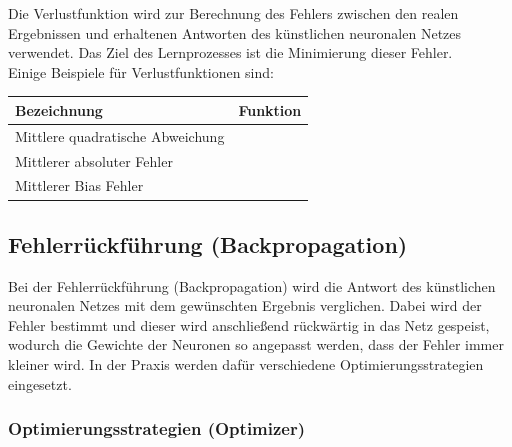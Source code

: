 	Die Verlustfunktion wird zur Berechnung des Fehlers zwischen den realen Ergebnissen und erhaltenen Antworten des künstlichen neuronalen Netzes verwendet. Das Ziel des Lernprozesses ist die Minimierung dieser Fehler.  \cite{ai-united} \\

	Einige Beispiele für Verlustfunktionen sind:
	\begin{center}
	\begin{tabular}[t]{|l|l|}
		\hline
		\textbf{Bezeichnung} & \textbf{Funktion} \\
		\hline
		Mittlere quadratische Abweichung  &  
		\addvbuffer[0.05cm]{
			$ \textrm{\acs{mse}} = \frac{\sum_{i=1}^{n} (y_i - \hat{y_i})^2}{n} $
		} \\
		\hline
		Mittlerer absoluter Fehler  &  
		\addvbuffer[0.05cm]{
			$ \textrm{\acs{mae}} = \frac{\sum_{i=1}^{n} |y_i - \hat{y_i}|}{n} $
		} \\
		\hline
		Mittlerer Bias Fehler  &  
		\addvbuffer[0.05cm]{
			$ \textrm{\acs{mbe}} = \frac{\sum_{i=1}^{n} (y_i - \hat{y_i})}{n} $
		} \\
		\hline
		
	\end{tabular}
	\end{center}

\subsection{Fehlerrückführung (Backpropagation)}

	Bei der Fehlerrückführung (Backpropagation) wird die Antwort des künstlichen neuronalen Netzes mit dem gewünschten Ergebnis verglichen. Dabei wird der Fehler bestimmt und dieser wird anschließend rückwärtig in das Netz gespeist, wodurch die Gewichte der Neuronen so angepasst werden, dass der Fehler immer kleiner wird. In der Praxis werden dafür verschiedene Optimierungsstrategien eingesetzt. \cite{rocketloop}
	
\subsubsection{Optimierungsstrategien (Optimizer)}

